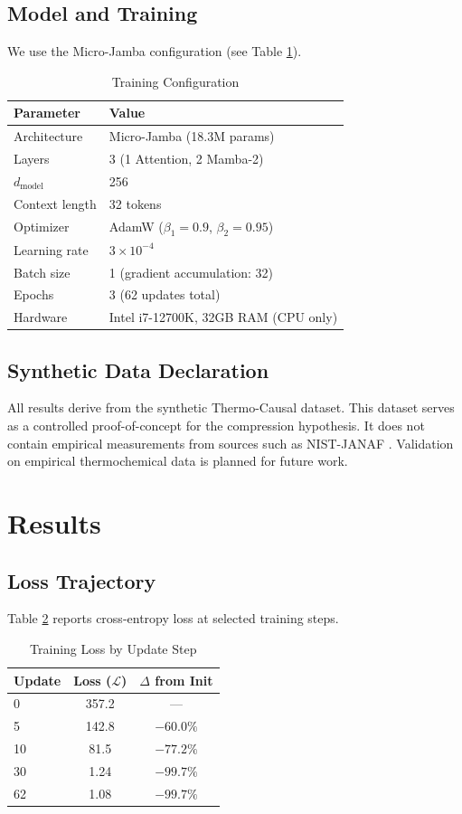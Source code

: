\documentclass{article}
\begin{document}
\subsection{Model and Training}
We use the Micro-Jamba configuration (see Table \ref{tab:config}).

\begin{table}[h]
\centering
\caption{Training Configuration}
\label{tab:config}
\begin{tabular}{@{}ll@{}}
\toprule
\textbf{Parameter} & \textbf{Value} \\
\midrule
Architecture & Micro-Jamba (18.3M params) \\
Layers & 3 (1 Attention, 2 Mamba-2) \\
$d_{\mathrm{model}}$ & 256 \\
Context length & 32 tokens \\
Optimizer & AdamW ($\beta_1=0.9$, $\beta_2=0.95$) \\
Learning rate & $3 \times 10^{-4}$ \\
Batch size & 1 (gradient accumulation: 32) \\
Epochs & 3 (62 updates total) \\
Hardware & Intel i7-12700K, 32GB RAM (CPU only) \\
\bottomrule
\end{tabular}
\end{table}

\subsection{Synthetic Data Declaration}
All results derive from the synthetic Thermo-Causal dataset. This dataset serves as a controlled proof-of-concept for the compression hypothesis. It does not contain empirical measurements from sources such as NIST-JANAF \cite{JANAF}. Validation on empirical thermochemical data is planned for future work.

\section{Results}

\subsection{Loss Trajectory}
Table \ref{tab:loss} reports cross-entropy loss at selected training steps.

\begin{table}[h]
\centering
\caption{Training Loss by Update Step}
\label{tab:loss}
\begin{tabular}{@{}lcc@{}}
\toprule
\textbf{Update} & \textbf{Loss ($\mathcal{L}$)} & \textbf{$\Delta$ from Init} \\
\midrule
0 & 357.2 & --- \\
5 & 142.8 & $-60.0\%$ \\
10 & 81.5 & $-77.2\%$ \\
30 & 1.24 & $-99.7\%$ \\
62 & 1.08 & $-99.7\%$ \\
\bottomrule
\end{tabular}
\end{table}
\end{document}
